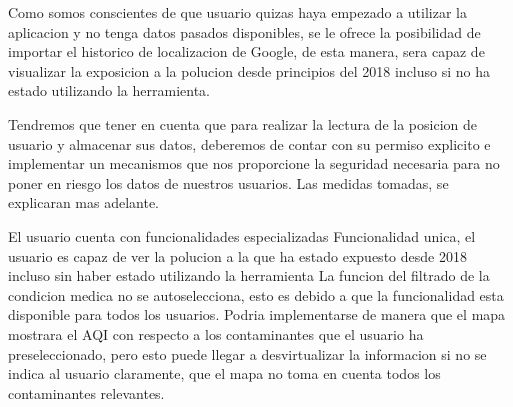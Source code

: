 Como somos conscientes de que usuario quizas haya empezado a utilizar la aplicacion y no tenga datos pasados disponibles,
se le ofrece la posibilidad de importar el historico de localizacion de Google, de esta manera, sera capaz de visualizar
la exposicion a la polucion desde principios del 2018 incluso si no ha estado utilizando la herramienta.  

Tendremos que tener en cuenta que para realizar la lectura de la posicion de usuario y almacenar sus datos, deberemos de 
contar con su permiso explicito e implementar un mecanismos que nos proporcione la seguridad necesaria para no poner en 
riesgo los datos de nuestros usuarios. Las medidas tomadas, se explicaran mas adelante.
 
\begin{itemize}
    \done El usuario cuenta con funcionalidades especializadas 
    \done Funcionalidad unica, el usuario es capaz de ver la polucion a la que ha estado expuesto desde 2018 incluso
    sin haber estado utilizando la herramienta
    \crossed La funcion del filtrado de la condicion medica no se autoselecciona, esto es debido a que la funcionalidad
    esta disponible para todos los usuarios. Podria implementarse de manera que el mapa mostrara el AQI con respecto a los
    contaminantes que el usuario ha preseleccionado, pero esto puede llegar a desvirtualizar la informacion si no se 
    indica al usuario claramente, que el mapa no toma en cuenta todos los contaminantes relevantes.
\end{itemize}
 \newpage